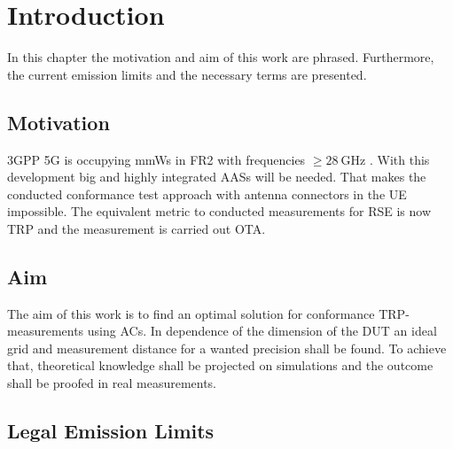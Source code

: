 \chapter{Introduction}

In this chapter the motivation and aim of this work are phrased. Furthermore, the current emission limits and the necessary terms are presented.

\section{Motivation}

\ac{3GPP} \ac{5G} is occupying \acp{mmW} in \ac{FR2} with frequencies $\ge\SI{28}{\giga\hertz}$ \cite{trp}. With this development big and highly integrated  \acp{AAS} will be needed. That makes the conducted conformance test approach with antenna connectors in the \ac{UE} impossible. The equivalent metric to conducted measurements for \ac{RSE} is now \ac{TRP} and the measurement is carried out \ac{OTA}.


\section{Aim}

The aim of this work is to find an optimal solution for conformance  \ac{TRP}-measurements using \acp{AC}. In dependence of the dimension of the \ac{DUT} an ideal grid and measurement distance for a wanted precision shall be found. To achieve that, theoretical knowledge shall be projected on simulations and the outcome shall be proofed in real measurements.

\section{Legal Emission Limits}
\label{sec:legem}

